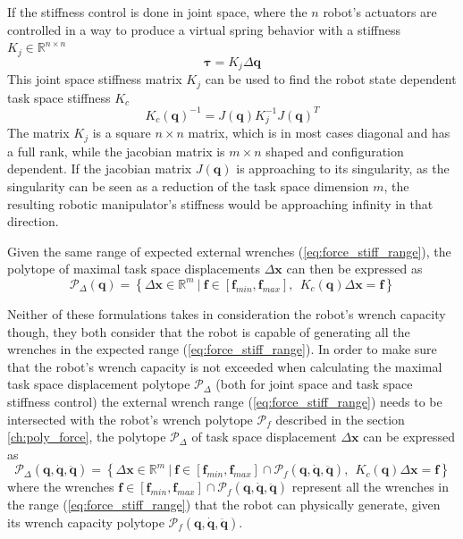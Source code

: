 If the stiffness control is done in joint space, where the $n$ robot's actuators are controlled in a way to produce a virtual spring behavior with a stiffness $K_j\in \mathbb{R}^{n\times n}$
\begin{equation}
    \bm{\tau} = K_j \Delta\bm{q}
\end{equation}
This joint space stiffness matrix $K_j$ can be used to find the robot state dependent task space stiffness $K_c$ \cite{Salisbury1980}
\begin{equation}
     K_c(\bm{q})^{-1} = J(\bm{q}) K_j^{-1}J(\bm{q})^T
     \label{eq:stiffness_roobt_eef}
\end{equation}
The matrix $K_j$ is a square $n \times n$ matrix, which is in most cases diagonal and has a full rank, while the jacobian matrix is $m\times n$ shaped and configuration dependent. If the jacobian matrix $J(\bm{q})$ is approaching to its singularity, as the singularity can be seen as a reduction of the task space dimension $m$, the resulting robotic manipulator's stiffness would be approaching infinity in that direction. 

Given the same range of expected external wrenches (\ref{eq:force_stiff_range}), the polytope of maximal task space displacements $\Delta\bm{x}$ can then be expressed as
\begin{equation}
    \mathcal{P}_\Delta(\bm{q}) = \left\{ \Delta\bm{x} \in \mathbb{R}^m ~|~ \bm{f}\in\left[\bm{f}_{min}, \bm{f}_{max} \right], ~~ K_c(\bm{q})\Delta\bm{x} = \bm{f} \right\}
\end{equation}


Neither of these formulations takes in consideration the robot's wrench capacity though, they both consider that the robot is capable of generating all the wrenches in the expected range (\ref{eq:force_stiff_range}). 
In order to make sure that the robot's wrench capacity is not exceeded when calculating the maximal task space displacement polytope $\mathcal{P}_\Delta$ (both for joint space and task space stiffness control) the external wrench range (\ref{eq:force_stiff_range}) needs to be intersected with the robot's  wrench polytope  $\mathcal{P}_f$ described in the section \ref{ch:poly_force}, the polytope $\mathcal{P}_\Delta$ of task space displacement $\Delta \bm{x}$ can be expressed as
\begin{equation}
    \mathcal{P}_\Delta(\bm{q},\dot{\bm{q}},\ddot{\bm{q}}) = \left\{ \Delta\bm{x} \in \mathbb{R}^m ~|~ \bm{f}\in \left[\bm{f}_{min}, \bm{f}_{max} \right] \cap \mathcal{P}_f(\bm{q},\dot{\bm{q}},\ddot{\bm{q}}),  ~~  K_c(\bm{q})\Delta\bm{x}=\bm{f}\right\}
\end{equation}
where the wrenches $\bm{f}\in \left[\bm{f}_{min}, \bm{f}_{max} \right] \cap \mathcal{P}_f(\bm{q},\dot{\bm{q}},\ddot{\bm{q}})$ represent all the wrenches in the range (\ref{eq:force_stiff_range}) that the robot can physically generate, given its wrench capacity polytope $\mathcal{P}_f(\bm{q},\dot{\bm{q}},\ddot{\bm{q}})$.

